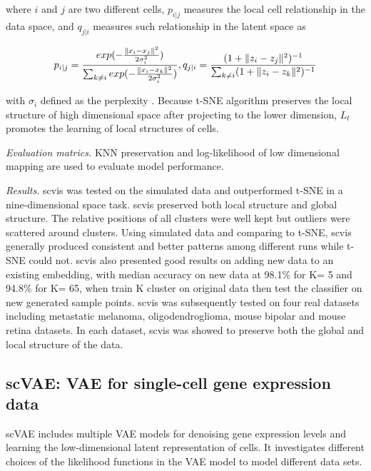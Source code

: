 \documentclass[
]{book}
\begin{document}
where \(i\) and \(j\) are two different cells, \(p_{i\vert j}\) measures the local cell relationship in the data space, and \(q_{j \vert i}\) measures such relationship in the latent space as

\begin{equation}
p_{i \vert j} = \frac{exp(- \frac{\|x_{i}-x_{j} \|^{2}}{2\sigma_{i}^{2}})}{\sum_{k\ne i}exp(- \frac{\|x_{i}-x_{k} \|^{2}}{2\sigma_{i}^{2}})},\space q_{j \vert i} = \frac{(1+\|z_{i}-z_{j} \|^{2})^{-1}}{\sum_{k\ne i}(1+\|z_{i}-z_{k} \|^{2})^{-1}} \label{eq:eq28}
\end{equation}

with \(\sigma_{i}\) defined as the perplexity \citep{RN147}. Because t-SNE algorithm preserves the local structure of high dimensional space after projecting to the lower dimension, \(L_{t}\) promotes the learning of local structures of cells.

\emph{Evaluation matrics.} KNN preservation and log-likelihood of low dimensional mapping are used to evaluate model performance.

\emph{Results.} scvis was tested on the simulated data and outperformed t-SNE in a nine-dimensional space task. scvis preserved both local structure and global structure. The relative positions of all clusters were well kept but outliers were scattered around clusters. Using simulated data and comparing to t-SNE, scvis generally produced consistent and better patterns among different runs while t-SNE could not. scvis also presented good results on adding new data to an existing embedding, with median accuracy on new data at 98.1\% for K= 5 and 94.8\% for K= 65, when train K cluster on original data then test the classifier on new generated sample points. scvis was subsequently tested on four real datasets including metastatic melanoma, oligodendroglioma, mouse bipolar and mouse retina datasets. In each dataset, scvis was showed to preserve both the global and local structure of the data.

\hypertarget{ch-5-3-4}{%
\subsection{scVAE: VAE for single-cell gene expression data}\label{ch-5-3-4}}

scVAE \citep{RN129} includes multiple VAE models for denoising gene expression levels and learning the low-dimensional latent representation of cells. It investigates different choices of the likelihood functions in the VAE model to model different data sets.
\end{document}
